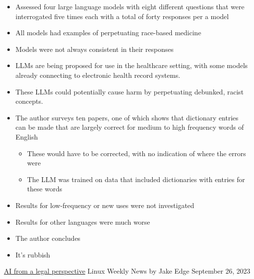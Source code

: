 \documentclass[25pt,a4paper,landscape,headrule,footrule,xetex]{foils}
\begin{document}
\begin{itemize}
\item Assessed four large language models with eight different questions that were
interrogated five times each with a total of forty responses per a model
\item All models had examples
of perpetuating race-based medicine
\item Models were not always consistent in
their responses 
\item  LLMs are being proposed for use in the healthcare setting, with
some models already connecting to electronic health record systems. 
\item These LLMs could potentially cause harm by perpetuating debunked,
racist concepts. 
\end{itemize}


\begin{itemize}\addtolength{\itemsep}{-1ex}
\item The author surveys ten papers, one of which shows that dictionary entries can be made that are largely correct for medium to high frequency words of English
  \begin{itemize}
  \item These would have to be corrected, with no indication of where the errors were
  \item The LLM was trained on data that included dictionaries with entries for these words
  \end{itemize}
\item Results for low-frequency or new uses were not investigated
\item Results for other languages were much worse
\item The author concludes 
\item It's rubbish
\end{itemize}




\href{https://lwn.net/Articles/945504/}{AI from a legal perspective} Linux Weekly News by Jake Edge September 26, 2023
\end{document}
